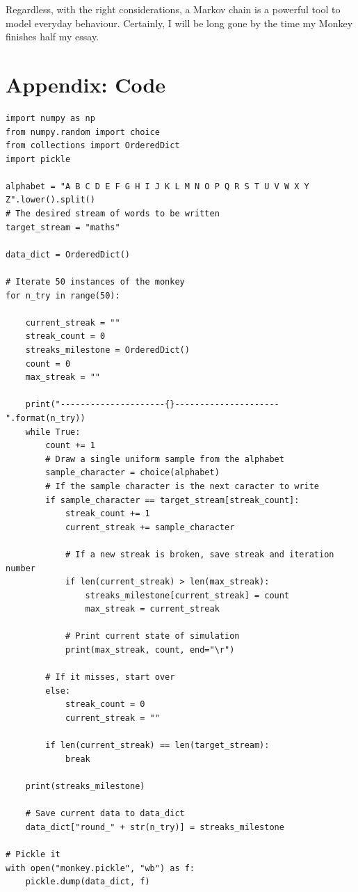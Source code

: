 \documentclass{article}
\begin{document}
Regardless, with the right considerations, a Markov chain is a powerful tool to model everyday behaviour. Certainly, I will be long gone by the time my Monkey finishes half my essay.

\newpage
\section{Appendix: Code}

\begin{Verbatim}[fontsize=\footnotesize]
import numpy as np
from numpy.random import choice
from collections import OrderedDict
import pickle

alphabet = "A B C D E F G H I J K L M N O P Q R S T U V W X Y Z".lower().split()
# The desired stream of words to be written
target_stream = "maths"

data_dict = OrderedDict()

# Iterate 50 instances of the monkey
for n_try in range(50):

    current_streak = ""
    streak_count = 0
    streaks_milestone = OrderedDict()
    count = 0
    max_streak = ""

    print("---------------------{}---------------------".format(n_try))
    while True:
        count += 1
        # Draw a single uniform sample from the alphabet
        sample_character = choice(alphabet)
        # If the sample character is the next caracter to write
        if sample_character == target_stream[streak_count]:
            streak_count += 1
            current_streak += sample_character

            # If a new streak is broken, save streak and iteration number
            if len(current_streak) > len(max_streak):
                streaks_milestone[current_streak] = count
                max_streak = current_streak

            # Print current state of simulation
            print(max_streak, count, end="\r")

        # If it misses, start over 
        else:
            streak_count = 0
            current_streak = ""

        if len(current_streak) == len(target_stream):
            break

    print(streaks_milestone)

    # Save current data to data_dict
    data_dict["round_" + str(n_try)] = streaks_milestone

# Pickle it
with open("monkey.pickle", "wb") as f:
    pickle.dump(data_dict, f)
\end{Verbatim}
\end{document}
